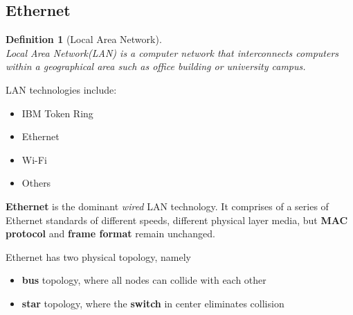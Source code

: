 \documentclass[12pt]{article}
\newtheorem{definition}{Definition}[section]
\theoremstyle{definition}
\begin{document}
\subsection{Ethernet}
\begin{definition}[Local Area Network]
\hfill\\\normalfont Local Area Network(LAN) is a computer network that interconnects computers within a geographical area such as office building or university campus.
\end{definition}
LAN technologies include:
\begin{itemize}
  \item IBM Token Ring
  \item Ethernet
  \item Wi-Fi
  \item Others
\end{itemize}
\textbf{Ethernet} is the dominant \textit{wired} LAN technology. It comprises of a series of Ethernet standards of different speeds, different physical layer media, but \textbf{MAC protocol} and \textbf{frame format} remain unchanged.

Ethernet has two physical topology, namely 
\begin{itemize}
\item \textbf{bus} topology, where all nodes can collide with each other
\item \textbf{star} topology, where the \textbf{switch} in center eliminates collision
\end{itemize}
\end{document}
